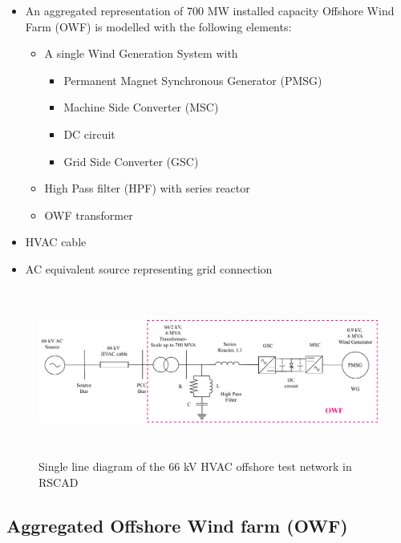 \begin{itemize}
    \item An aggregated representation of 700 MW installed capacity Offshore Wind Farm (\gls{OWF}) is modelled with the following elements:
    \begin{itemize}
        \item A single Wind Generation System with 
    \begin{itemize}
        \item Permanent Magnet Synchronous Generator (\gls{PMSG})
        \item Machine Side Converter (\gls{MSC})
        \item \gls{DC} circuit
        \item Grid Side Converter (\gls{GSC}) 
    \end{itemize}
        \item High Pass filter (\gls{HPF}) with series reactor
        \item \gls{OWF} transformer
    \end{itemize}
    \item \gls{HVAC} cable  
     \item AC equivalent source representing grid connection
\end{itemize}

\begin{figure}[H]
\centering
    \includegraphics[height = 5.5cm,width = \textwidth]{Diagrams/Chapter_3/WT1_AC_RSCAD_OWF.pdf}
    \caption{Single line diagram of the 66 kV HVAC offshore test network in RSCAD}
    \label{fig:WT1_Model_RSCAD}
\end{figure}

\subsection{ Aggregated Offshore Wind farm (OWF)}\label{OWF}

